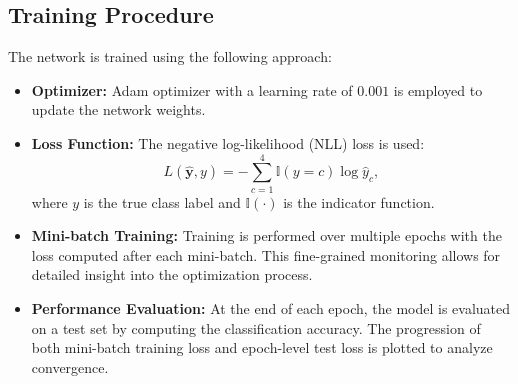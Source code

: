 \documentclass{article}
\begin{document}
\subsection*{Training Procedure}
The network is trained using the following approach:
\begin{itemize}
    \item \textbf{Optimizer:}  
    Adam optimizer with a learning rate of \(0.001\) is employed to update the network weights.
    \item \textbf{Loss Function:}  
    The negative log-likelihood (NLL) loss is used:
    \[
    L(\hat{\mathbf{y}}, y) = -\sum_{c=1}^{4} \mathbb{I}(y = c) \log \hat{y}_c,
    \]
    where \(y\) is the true class label and \(\mathbb{I}(\cdot)\) is the indicator function.
    \item \textbf{Mini-batch Training:}  
    Training is performed over multiple epochs with the loss computed after each mini-batch. This fine-grained monitoring allows for detailed insight into the optimization process.
    \item \textbf{Performance Evaluation:}  
    At the end of each epoch, the model is evaluated on a test set by computing the classification accuracy. The progression of both mini-batch training loss and epoch-level test loss is plotted to analyze convergence.
\end{itemize}
\end{document}
